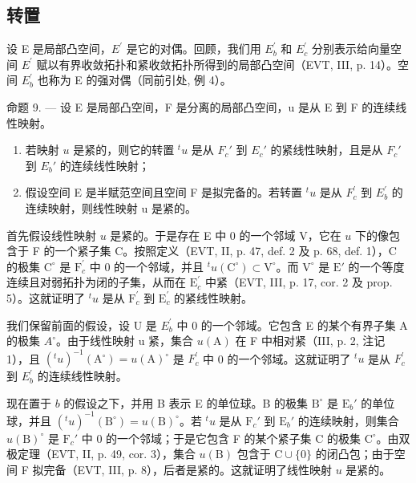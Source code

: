 \subsection{转置}

设 E 是局部凸空间，\(E^{\prime}\) 是它的对偶。回顾，我们用 \(E_{b}^{\prime}\) 和 \(E_{c}^{\prime}\) 分别表示给向量空间 \(E^{\prime}\) 赋以有界收敛拓扑和紧收敛拓扑所得到的局部凸空间（EVT, III, p. 14）。空间 \(E_{b}^{\prime}\) 也称为 E 的强对偶（同前引处, 例 4）。

命题 9. --- 设 E 是局部凸空间，F 是分离的局部凸空间，u 是从 E 到 F 的连续线性映射。

\begin{enumerate}
\def\labelenumi{\alph{enumi})}
\item
  若映射 \(u\) 是紧的，则它的转置 \(^{t}u\) 是从 \(F_c'\) 到 \(E_c'\) 的紧线性映射，且是从 \(F_c'\) 到 \(E_b'\) 的连续线性映射；
\item
  假设空间 E 是半赋范空间且空间 F 是拟完备的。若转置 \({}^{t}u\) 是从 \(F_{c}^{\prime}\) 到 \(E_{b}^{\prime}\) 的连续映射，则线性映射 u 是紧的。
\end{enumerate}

首先假设线性映射 \(u\) 是紧的。于是存在 E 中 0 的一个邻域 V，它在 \(u\) 下的像包含于 F 的一个紧子集 C。按照定义（EVT, II, p. 47, def. 2 及 p. 68, def. 1），C 的极集 \(\mathrm{C}^{\circ}\) 是 \(\mathrm{F}_c^\prime\) 中 0 的一个邻域，并且 \({}^t u(\mathrm{C}^\circ) \subset \mathrm{V}^\circ\)。而 \(\mathrm{V}^\circ\) 是 \(\mathrm{E}'\) 的一个等度连续且对弱拓扑为闭的子集，从而在 \(\mathrm{E}_c^\prime\) 中紧（EVT, III, p. 17, cor. 2 及 prop. 5）。这就证明了 \({}^t u\) 是从 \(\mathrm{F}_c^\prime\) 到 \(\mathrm{E}_c^\prime\) 的紧线性映射。

我们保留前面的假设，设 U 是 \(E_{b}^{\prime}\) 中 0 的一个邻域。它包含 E 的某个有界子集 A 的极集 \(A^{\circ}\)。由于线性映射 u 紧，集合 \(u(\mathrm{A})\) 在 F 中相对紧（III, p. 2, 注记 1），且 \((^{t}u)^{-1}(\mathrm{A}^{\circ}) = u(\mathrm{A})^{\circ}\) 是 \(F_{c}^{\prime}\) 中 0 的一个邻域。这就证明了 \(^{t}u\) 是从 \(F_{c}^{\prime}\) 到 \(E_{b}^{\prime}\) 的连续线性映射。

现在置于 \(b\) 的假设之下，并用 B 表示 E 的单位球。B 的极集 \(\mathrm{B}^{\circ}\) 是 \(\mathrm{E}_b'\) 的单位球，并且 \((^{t}u)^{-1}(\mathrm{B}^{\circ}) = u(\mathrm{B})^{\circ}\)。若 \(^{t}u\) 是从 \(\mathrm{F}_c'\) 到 \(\mathrm{E}_b'\) 的连续映射，则集合 \(u(\mathrm{B})^{\circ}\) 是 \(\mathrm{F}_c'\) 中 0 的一个邻域；于是它包含 F 的某个紧子集 C 的极集 \(\mathrm{C}^{\circ}\)。由双极定理（EVT, II, p. 49, cor. 3），集合 \(u(\mathrm{B})\) 包含于 \(\mathrm{C} \cup \{0\}\) 的闭凸包；由于空间 F 拟完备（EVT, III, p. 8），后者是紧的。这就证明了线性映射 \(u\) 是紧的。

